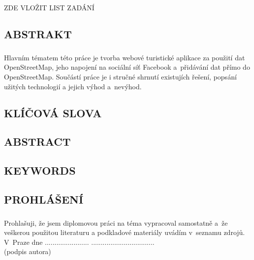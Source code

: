 \documentclass[11pt,a4paper,titlepage,oneside]{book}
\begin{document}
\newpage %
	\begin{center}
		\vspace*{15cm}
		{\Large ZDE VLOŽIT LIST ZADÁNÍ}
	\end{center}

\begin{flushleft}
	\chapter*{}
	\section*{ABSTRAKT}
	\paragraph{} Hlavním tématem této práce je tvorba webové turistické aplikace za použití dat OpenStreetMap, jeho napojení na sociální síť Facebook a~přidávání dat přímo do OpenStreetMap. Součástí práce je i stručné shrnutí existujích řešení, popsání užitých technologií a jejich výhod a~nevýhod.
	\section*{KLÍČOVÁ SLOVA}
	{}
	\section*{ABSTRACT}
	\paragraph{}
	\section*{KEYWORDS}
	{\sc{}}
\end{flushleft}

\newpage %
	\vspace*{15cm}
	\section*{\Large PROHLÁŠENÍ}
		\paragraph{}Prohlašuji, že jsem diplomovou práci na téma  vypracoval samostatně a~že veškerou použitou literaturu a podkladové materiály uvádím v~seznamu zdrojů.\\[1cm]
	V~Praze dne ....................... ................................. \\
	 {(podpis autora)\hspace{0.25cm} }
	
\end{document}
